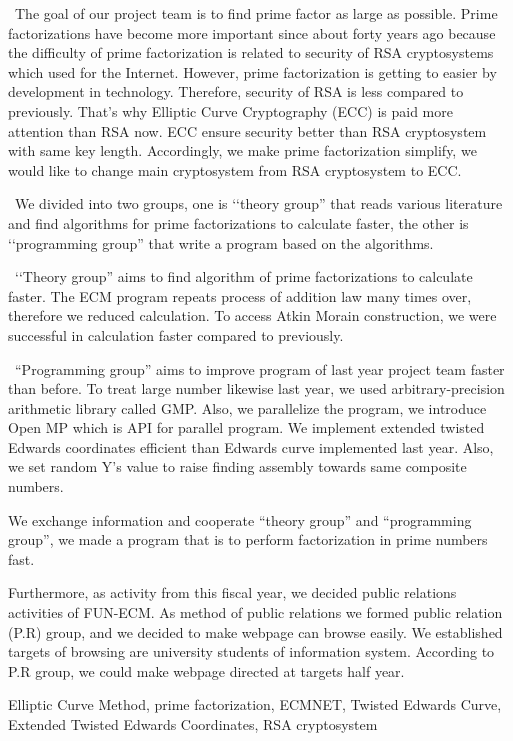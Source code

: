 \documentclass[openany,11pt,papersize]{jsbook}
\begin{document}
\begin{eabstract}

~The goal of our project team is to find prime factor as large as possible. 
Prime factorizations have become more important since about forty years ago 
because the difficulty of prime factorization is related to security of RSA cryptosystems 
which used for the Internet. 
However, prime factorization is getting to easier by development in technology. 
Therefore, security of RSA is less compared to previously. 
That's why Elliptic Curve Cryptography (ECC) is paid more attention than RSA now. 
ECC ensure security better than RSA cryptosystem with same key length. 
Accordingly, we make prime factorization simplify, 
we would like to change main cryptosystem from RSA cryptosystem to ECC. 

~We divided into two groups, one is \lq\lq theory group'' that reads various literature 
and find algorithms for prime factorizations to calculate faster, 
the other is \lq\lq programming group'' that write a program based on the algorithms.

 ~\lq\lq Theory group'' aims to find algorithm of prime factorizations to calculate faster. 
The ECM program repeats process of addition law many times over, therefore we reduced calculation. To access Atkin Morain construction, we were successful in calculation faster compared to previously.

~“Programming group” aims to improve program of last year project team faster than before. To treat large number likewise last year, we used arbitrary-precision arithmetic library called GMP. Also, we parallelize the program, we introduce Open MP which is API for parallel program. We implement extended twisted Edwards coordinates efficient than Edwards curve implemented last year. Also, we set random Y’s value to raise finding assembly towards same composite numbers.
 
 We exchange information and cooperate “theory group” and “programming group”, we made a program that is to perform factorization in prime numbers fast.
 
 Furthermore, as activity from this fiscal year, we decided public relations activities of FUN-ECM. As method of public relations we formed public relation (P.R) group, and we decided to make webpage can browse easily. We established targets of browsing are university students of information system.
According to P.R group, we could make webpage directed at targets half year.
\begin{ekeyword}
Elliptic Curve Method, prime factorization, ECMNET, Twisted Edwards Curve, Extended Twisted Edwards Coordinates, RSA cryptosystem
\end{ekeyword}
\end{eabstract}
\end{document}
